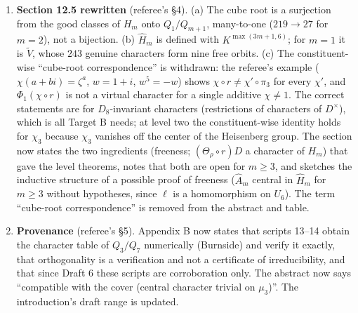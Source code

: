 \documentclass[11pt]{article}
\begin{document}
\begin{enumerate}[leftmargin=*]
$\hat H$ are all defined in the same normalization; the parenthetical
in Step 1 says how $\ker\tilde\theta_1$ and $\varepsilon_\rho$ are used
when $\theta_\rho=\mathrm{sgn}$.
\item \textbf{Section 12.5 rewritten} (referee's \S4).  (a) The cube
root is a surjection from the good classes of $H_m$ onto $Q_1/Q_{m+1}$,
many-to-one ($219\to27$ for $m=2$), not a bijection.  (b) $\hat H_m$
is defined with $K^{\max(3m+1,6)}$; for $m=1$ it is $\tilde V$, whose
$243$ genuine characters form nine free orbits.  (c) The constituent-wise
``cube-root correspondence'' is withdrawn: the referee's example
($\chi(a+bi)=\zeta^a$, $w=1+i$, $w^5=-w$) shows $\chi\circ r\neq\chi'\circ\pi_3$
for every $\chi'$, and $\Phi_1(\chi\circ r)$ is not a virtual character
for a single additive $\chi\neq1$.  The correct statements are for
$D_8$-invariant characters (restrictions of characters of $D^\times$),
which is all Target B needs; at level two the constituent-wise identity
holds for $\chi_3$ because $\chi_3$ vanishes off the center of the
Heisenberg group.  The section now states the two ingredients
(freeness; $(\Theta_\rho\circ r)D$ a character of $H_m$) that gave the
level theorems, notes that both are open for $m\ge3$, and sketches the
inductive structure of a possible proof of freeness ($\hat A_m$ central
in $\hat H_m$ for $m\ge3$ without hypotheses, since $\ell$ is a
homomorphism on $U_6$).  The term ``cube-root correspondence'' is
removed from the abstract and table.
\item \textbf{Provenance} (referee's \S5).  Appendix B now states that
scripts 13--14 obtain the character table of $Q_3/Q_7$ numerically
(Burnside) and verify it exactly, that orthogonality is a verification
and not a certificate of irreducibility, and that since Draft 6 these
scripts are corroboration only.  The abstract now says ``compatible
with the cover (central character trivial on $\mu_3$)''.  The
introduction's draft range is updated.
\end{enumerate}
\end{document}
